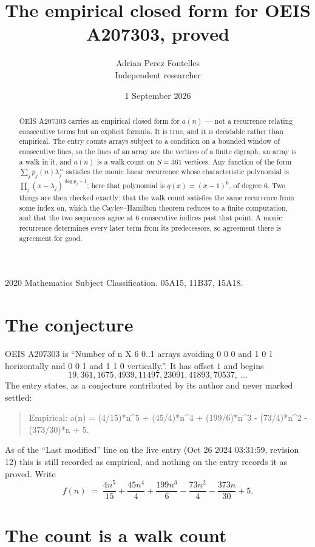 \documentclass[11pt,a4paper]{article}
\title{The empirical closed form for OEIS A207303, proved}
\author{Adrian Perez Fontelles\\ \small Independent researcher}
\date{1 September 2026}
\theoremstyle{plain}
\theoremstyle{definition}
\begin{document}
\maketitle

\begin{abstract}
OEIS A207303 carries an empirical closed form for $a(n)$ --- not a recurrence relating
consecutive terms but an explicit formula. It is true, and it is decidable rather than
empirical. The entry counts arrays subject to a condition on a bounded window of consecutive lines, so the lines of an array are the
vertices of a finite digraph, an array is a walk in it, and $a(n)$ is a walk count on
$S=361$ vertices. Any function of the form $\sum_j p_j(n)\lambda_j^{\,n}$ satisfies the
monic linear recurrence whose characteristic polynomial is
$\prod_j(x-\lambda_j)^{\deg p_j+1}$; here that polynomial is $q(x)=(x-1)^{6}$, of degree
$6$. Two things are then checked exactly: that the walk count satisfies the same
recurrence from some index on, which the Cayley--Hamilton theorem reduces to a finite
computation, and that the two sequences agree at $6$ consecutive indices past that
point. A monic recurrence determines every later term from its predecessors, so agreement
there is agreement for good.
\end{abstract}

\noindent\small 2020 Mathematics Subject Classification. 05A15, 11B37, 15A18.\normalsize

\section{The conjecture}

OEIS A207303 is ``Number of n X 6 0..1 arrays avoiding 0 0 0 and 1 0 1 horizontally and 0 0 1 and 1 1 0 vertically.''. It has offset $1$ and begins
\[
19, 361, 1675, 4939, 11497, 23091, 41893, 70537,\ \dots
\]
The entry states, as a conjecture contributed by its author and never marked settled:
\begin{quote}
Empirical: a(n) = (4/15)*n\^{}5 + (45/4)*n\^{}4 + (199/6)*n\^{}3 - (73/4)*n\^{}2 - (373/30)*n + 5.
\end{quote}
As of the ``Last modified'' line on the live entry (Oct 26 2024 03:31:59, revision 12) this is still
recorded as empirical, and nothing on the entry records it as proved. Write
\[
f(n)\;=\;\frac{4 n^{5}}{15} + \frac{45 n^{4}}{4} + \frac{199 n^{3}}{6} - \frac{73 n^{2}}{4} - \frac{373 n}{30} + 5.
\]

\section{The count is a walk count}
\end{document}
